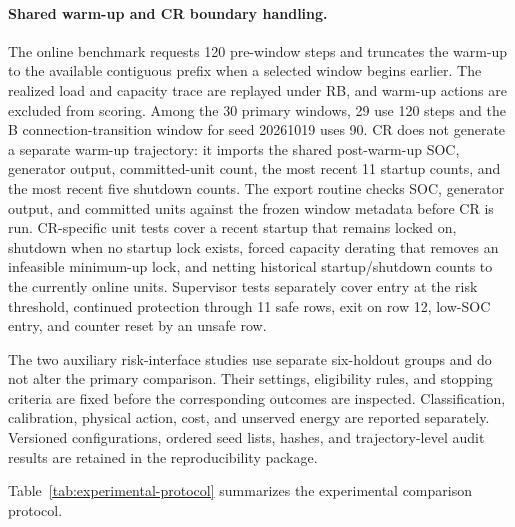 \paragraph{Shared warm-up and CR boundary handling.}
The online benchmark requests 120 pre-window steps and truncates the warm-up
to the available contiguous prefix when a selected window begins earlier.
The realized load and capacity trace are replayed under RB, and warm-up actions
are excluded from scoring. Among the 30 primary windows, 29 use 120 steps and
the B connection-transition window for seed 20261019 uses 90. CR does not
generate a separate warm-up trajectory: it imports the shared post-warm-up
SOC, generator output, committed-unit count, the most recent 11 startup counts,
and the most recent five shutdown counts. The export routine checks SOC,
generator output, and committed units against the frozen window metadata before
CR is run. CR-specific unit tests cover a recent startup that remains locked
on, shutdown when no startup lock exists, forced capacity derating that removes
an infeasible minimum-up lock, and netting historical startup/shutdown counts
to the currently online units. Supervisor tests separately cover entry at the
risk threshold, continued protection through 11 safe rows, exit on row 12,
low-SOC entry, and counter reset by an unsafe row.

The two auxiliary risk-interface studies use separate six-holdout groups and
do not alter the primary comparison. Their settings, eligibility rules, and
stopping criteria are fixed before the corresponding outcomes are inspected.
Classification, calibration, physical action, cost, and unserved energy are
reported separately. Versioned configurations, ordered seed lists, hashes,
and trajectory-level audit results are retained in the reproducibility package.

Table~\ref{tab:experimental-protocol} summarizes the experimental comparison protocol.

